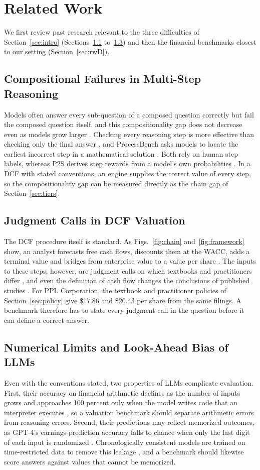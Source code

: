 \documentclass[conference]{IEEEtran}
\begin{document}
\section{Related Work}\label{sec:related}
We first review past research relevant to the three difficulties of Section~\ref{sec:intro} (Sections~\ref{sec:rwA} to~\ref{sec:rwC}) and then the financial benchmarks closest to our setting (Section~\ref{sec:rwD}).

\subsection{Compositional Failures in Multi-Step Reasoning}\label{sec:rwA}
Models often answer every sub-question of a composed question correctly but fail the composed question itself, and this compositionality gap does not decrease even as models grow larger \cite{b15}. Checking every reasoning step is more effective than checking only the final answer \cite{b16}, and ProcessBench asks models to locate the earliest incorrect step in a mathematical solution \cite{b17}. Both rely on human step labels, whereas P2S derives step rewards from a model's own probabilities \cite{p2s}. In a DCF with stated conventions, an engine supplies the correct value of every step, so the compositionality gap can be measured directly as the chain gap of Section~\ref{sec:tiers}.

\subsection{Judgment Calls in DCF Valuation}\label{sec:rwB}
The DCF procedure itself is standard. As Figs.~\ref{fig:chain} and~\ref{fig:framework} show, an analyst forecasts free cash flows, discounts them at the WACC, adds a terminal value and bridges from enterprise value to a value per share \cite{b3}. The inputs to these steps, however, are judgment calls on which textbooks and practitioners differ \cite{b3}, and even the definition of cash flow changes the conclusions of published studies \cite{b13}. For PPL Corporation, the textbook and practitioner policies of Section~\ref{sec:policy} give \$17.86 and \$20.43 per share from the same filings. A benchmark therefore has to state every judgment call in the question before it can define a correct answer.

\subsection{Numerical Limits and Look-Ahead Bias of LLMs}\label{sec:rwC}
Even with the conventions stated, two properties of LLMs complicate evaluation. First, their accuracy on financial arithmetic declines as the number of inputs grows and approaches 100 percent only when the model writes code that an interpreter executes \cite{b5}, so a valuation benchmark should separate arithmetic errors from reasoning errors. Second, their predictions may reflect memorized outcomes, as GPT-4's earnings-prediction accuracy falls to chance when only the last digit of each input is randomized \cite{b5}. Chronologically consistent models are trained on time-restricted data to remove this leakage \cite{b14}, and a benchmark should likewise score answers against values that cannot be memorized.
\end{document}

